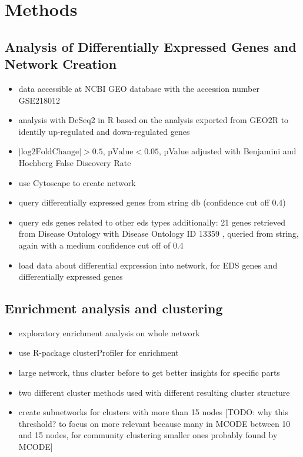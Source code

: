 \section{Methods}

\subsection{Analysis of Differentially Expressed Genes and Network Creation}\label{sec:methods-deg}
\begin{itemize}
	\item data accessible at NCBI GEO database with the accession number GSE218012 \cite{Ritelli2020} 
	\item analysis with DeSeq2 in R based on the analysis exported from GEO2R \cite{DESeq2} to identily up-regulated and down-regulated genes
	\item $|\text{log2FoldChange}| > 0.5$, $\text{pValue} <0.05$, pValue adjusted with Benjamini and Hochberg False Discovery Rate
\end{itemize}

\begin{itemize}
	\item use Cytoscape to create network \cite{Cytoscape}
	\item query differentially expressed genes from string db \cite{StringDB} (confidence cut off 0.4)
	\item query eds genes related to other eds types additionally: 21 genes retrieved from Disease Ontology with Disease Ontology ID 13359 \cite{DO}, queried from string, again with a medium confidence cut off of 0.4
	\item load data about differential expression into network, for EDS genes and differentially expressed genes
\end{itemize}

\subsection{Enrichment analysis and clustering}
\begin{itemize}
	\item exploratory enrichment analysis on whole network
	\item use R-package clusterProfiler \cite{Wu2021} for enrichment
	\item large network, thus cluster before to get better insights for specific parts
	\item two different cluster methods used with different resulting cluster structure
	\item create subnetworks for clusters with more than 15 nodes [TODO: why this threshold? to focus on more relevant because many in MCODE between 10 and 15 nodes, for community clustering smaller ones probably found by MCODE]
\end{itemize}
